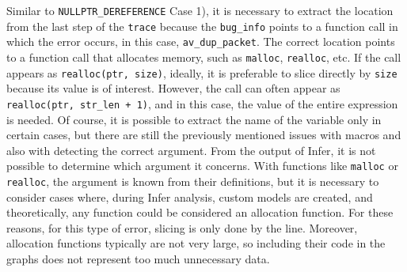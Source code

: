 Similar to \texttt{NULLPTR\_DEREFERENCE} Case 1), it is necessary to extract the location from the last step of the \texttt{trace} because the \texttt{bug\_info} points to a function call in which the error occurs, in this case, \texttt{av\_dup\_packet}. The correct location points to a function call that allocates memory, such as \texttt{malloc}, \texttt{realloc}, etc. If the call appears as \texttt{realloc(ptr, size)}, ideally, it is preferable to slice directly by \texttt{size} because its value is of interest. However, the call can often appear as \texttt{realloc(ptr, str\_len + 1)}, and in this case, the value of the entire expression is needed. Of course, it is possible to extract the name of the variable only in certain cases, but there are still the previously mentioned issues with macros and also with detecting the correct argument. From the output of Infer, it is not possible to determine which argument it concerns. With functions like \texttt{malloc} or \texttt{realloc}, the argument is known from their definitions, but it is necessary to consider cases where, during Infer analysis, custom models are created, and theoretically, any function could be considered an allocation function. For these reasons, for this type of error, slicing is only done by the line. Moreover, allocation functions typically are not very large, so including their code in the graphs does not represent too much unnecessary data.

